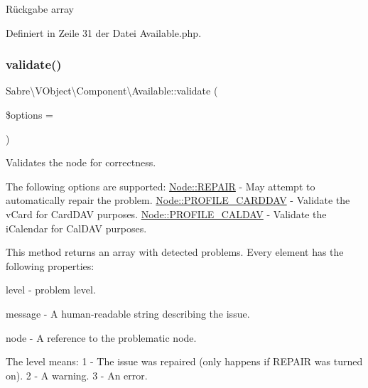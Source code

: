 \begin{DoxyReturn}{Rückgabe}
array 
\end{DoxyReturn}


Definiert in Zeile 31 der Datei Available.\+php.

\mbox{\label{class_sabre_1_1_v_object_1_1_component_1_1_available_abaedf6fbced847ec3fb3af9cabdbfa35}} 
\subsubsection{\texorpdfstring{validate()}{validate()}}
{\footnotesize\ttfamily Sabre\textbackslash{}\+V\+Object\textbackslash{}\+Component\textbackslash{}\+Available\+::validate (\begin{DoxyParamCaption}\item[{}]{\$options = {} }\end{DoxyParamCaption})}

Validates the node for correctness.

The following options are supported\+: \mbox{\hyperlink{class_sabre_1_1_v_object_1_1_node_ac97a7fb85c1f871523336cd1ec6b29a9}{Node\+::\+R\+E\+P\+A\+IR}} -\/ May attempt to automatically repair the problem. \mbox{\hyperlink{class_sabre_1_1_v_object_1_1_node_a0aac3de0b04bcc44bbf0e22ae47a51c3}{Node\+::\+P\+R\+O\+F\+I\+L\+E\+\_\+\+C\+A\+R\+D\+D\+AV}} -\/ Validate the v\+Card for Card\+D\+AV purposes. \mbox{\hyperlink{class_sabre_1_1_v_object_1_1_node_a1e68f819b7b5537929290e061ffeacc5}{Node\+::\+P\+R\+O\+F\+I\+L\+E\+\_\+\+C\+A\+L\+D\+AV}} -\/ Validate the i\+Calendar for Cal\+D\+AV purposes.

This method returns an array with detected problems. Every element has the following properties\+:


\begin{DoxyItemize}
\item level -\/ problem level.
\item message -\/ A human-\/readable string describing the issue.
\item node -\/ A reference to the problematic node.
\end{DoxyItemize}

The level means\+: 1 -\/ The issue was repaired (only happens if R\+E\+P\+A\+IR was turned on). 2 -\/ A warning. 3 -\/ An error.


